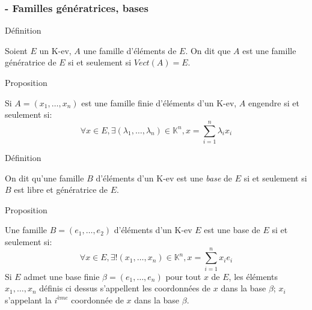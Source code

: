 \documentclass[10pt,a4paper]{beamer}
\newcounter{Def}
\newcounter{Pro}
\newcounter{Sec}
\begin{document}
\addtocounter{Sec}{1}

\begin{frame}

\frametitle{ - Familles génératrices, bases}

\begin{block}{Définition \theDef}
\addtocounter{Def}{1}
Soient $E$ un K-ev, $A$ une famille d'éléments de $E$. On dit que $A$ est une famille génératrice de $E$ si et seulement si $Vect(A)=E$.
\end{block}

\begin{block}{Proposition \thePro}
\addtocounter{Pro}{1}
Si $A=(x_1,\ldots,x_n)$ est une famille finie d'éléments d'un K-ev, $A$ engendre si et seulement si:\[ \forall x\in E, \exists(\lambda_1,\ldots,\lambda_n)\in\mathbb{K}^n, x=\sum_{i=1}^n\lambda_ix_i \]
\end{block}

\begin{block}{Définition \theDef}
\addtocounter{Def}{1}
On dit qu'une famille $B$ d'éléments d'un K-ev est une \emph{base} de $E$ si et seulement si $B$ est libre et génératrice de $E$.
\end{block}
\end{frame}
\begin{block}{Proposition \thePro}
\addtocounter{Pro}{1}
Une famille $B=(e_1,\ldots,e_2)$ d'éléments d'un K-ev $E$ est une base de $E$ si et seulement si: \[ \forall x\in E, \exists !(x_1,\ldots,x_n)\in\mathbb{K}^n, x=\sum_{i=1}^nx_ie_i \]
Si $E$ admet une base finie $\beta=(e_1,\ldots,e_n)$ pour tout $x$ de $E$, les éléments $x_1,\ldots,x_n$ définis ci dessus s'appellent les coordonnées de $x$ dans la base $\beta$; $x_i$ s'appelant la $i^{ème}$ coordonnée de $x$ dans la base $\beta$.
\end{block}
\begin{frame}

\end{frame}
\end{document}
